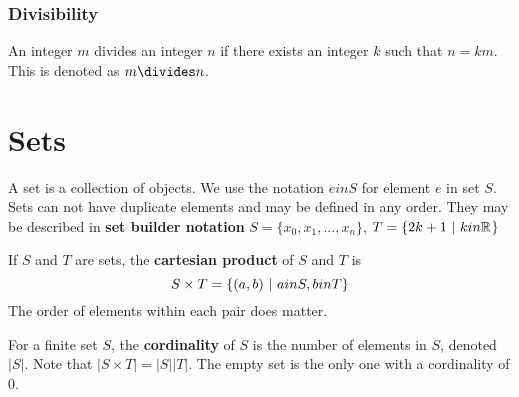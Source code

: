 \documentclass[12pt]{article}
\newcommand{\R}[1]{\mathbb{R}^{#1}}
\begin{document}


\subsubsection*{Divisibility}
 An integer $m$ divides an integer $n$ if there exists an integer $k$ such that $n = km$. This is denoted as $m \divides n$.



\section*{Sets}
A set is a collection of objects. We use the notation $e in S$ for element $e$ in set $S$. Sets can not have duplicate elements and may be defined in any order. They may be described in {\bf set builder notation} $S = \{ x_0, x_1, ... , x_n \}$, $T = \{ 2k + 1 \suchthat k in \R{} \}$

If $S$ and $T$ are sets, the {\bf cartesian product} of $S$ and $T$ is \[ S \times T = \{ (a,b) \ |\  a in S, b in T \} \] The order of elements within each pair does matter.

For a finite set $S$, the {\bf cordinality} of $S$ is the number of elements in $S$, denoted $|S|$. Note that $|S \times T| = |S||T|$. The empty set is the only one with a cordinality of 0.
\end{document}
